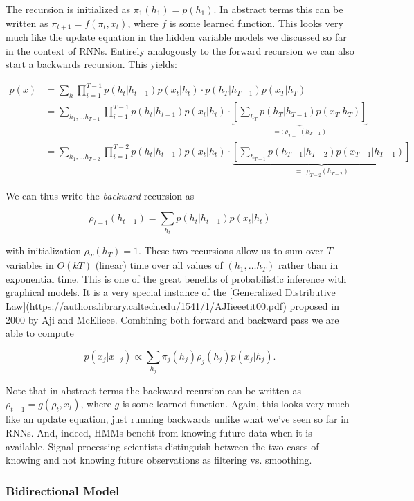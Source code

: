 The recursion is initialized as $\pi_1(h_1) = p(h_1)$. In abstract terms this can be written as $\pi_{t+1} = f(\pi_t, x_t)$, where $f$ is some learned function. This looks very much like the update equation in the hidden variable models we discussed so far in the context of RNNs. Entirely analogously to the forward recursion we can also start a backwards recursion. This yields:

$$\begin{aligned}
    p(x) & = \sum_h \prod_{i=1}^{T-1} p(h_t|h_{t-1}) p(x_t|h_t) \cdot p(h_T|h_{T-1}) p(x_T|h_T) \\
    & = \sum_{h_1, \ldots h_{T-1}} \prod_{i=1}^{T-1} p(h_t|h_{t-1}) p(x_t|h_t) \cdot
    \underbrace{\left[\sum_{h_T} p(h_T|h_{T-1}) p(x_T|h_T)\right]}_{=: \rho_{T-1}(h_{T-1})} \\
    & = \sum_{h_1, \ldots h_{T-2}} \prod_{i=1}^{T-2} p(h_t|h_{t-1}) p(x_t|h_t) \cdot
    \underbrace{\left[\sum_{h_{T-1}} p(h_{T-1}|h_{T-2}) p(x_{T-1}|h_{T-1})\right]}_{=: \rho_{T-2}(h_{T-2})}
\end{aligned}$$

We can thus write the \textit{backward} recursion as

$$\rho_{t-1}(h_{t-1})= \sum_{h_{t}} p(h_{t}|h_{t-1}) p(x_{t}|h_{t})$$

with initialization $\rho_T(h_T) = 1$. These two recursions allow us to sum over $T$ variables in $O(kT)$ (linear) time over all values of $(h_1, \ldots h_T)$ rather than in exponential time. This is one of the great benefits of probabilistic inference with graphical models. It is a very special instance of the [Generalized Distributive Law](https://authors.library.caltech.edu/1541/1/AJIieeetit00.pdf) proposed in 2000 by Aji and McEliece. Combining both forward and backward pass we are able to compute

$$p(x_j|x_{-j}) \propto \sum_{h_j} \pi_j(h_j) \rho_j(h_j) p(x_j|h_j).$$

Note that in abstract terms the backward recursion can be written as $\rho_{t-1} = g(\rho_t, x_t)$, where $g$ is some learned function. Again, this looks very much like an update equation, just running backwards unlike what we've seen so far in RNNs. And, indeed, HMMs benefit from knowing future data when it is available. Signal processing scientists distinguish between the two cases of knowing and not knowing future observations as filtering vs. smoothing.

\subsubsection{Bidirectional Model}


